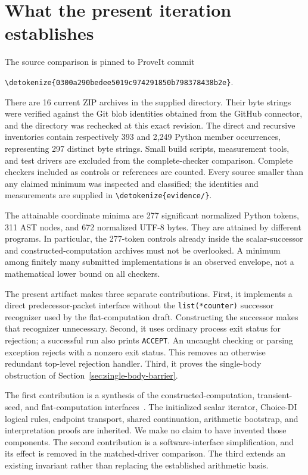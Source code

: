\documentclass[11pt,letterpaper]{article}
\theoremstyle{definition}\newtheorem{definition}[theorem]{Definition}
\theoremstyle{remark}\newtheorem{remark}[theorem]{Remark}
\newcommand{\file}[1]{\expandafter\nolinkurl\expandafter{\detokenize{#1}}}
\begin{document}
\section{What the present iteration establishes}

The source comparison is pinned to ProveIt commit
\begin{center}\small
\file{0300a290bedee5019c974291850b798378438b2e}.
\end{center}
There are 16 current ZIP archives in the supplied directory. Their byte
strings were verified against the Git blob identities obtained from the
GitHub connector, and the directory was rechecked at this exact revision.
The direct and recursive inventories contain respectively 393 and 2,249
Python member occurrences, representing 297 distinct byte strings.
Small build scripts, measurement tools, and test drivers are excluded from
the complete-checker comparison. Complete checkers included as controls
or references are counted. Every source smaller than any claimed minimum
was inspected and classified; the identities and measurements are supplied
in \file{evidence/}.

The attainable coordinate minima are 277 significant normalized Python
tokens, 311 AST nodes, and 672 normalized UTF-8 bytes. They are attained
by different programs. In particular, the 277-token controls already
inside the scalar-successor and constructed-computation archives must not
be overlooked. A minimum among finitely many submitted implementations
is an observed envelope, not a mathematical lower bound on all checkers.

The present artifact makes three separate contributions.
First, it implements a direct predecessor-packet interface without the
\texttt{list(*counter)} successor recognizer used by the flat-computation
draft. Constructing the successor makes that recognizer unnecessary.
Second, it uses ordinary process exit status for rejection; a successful
run also prints \texttt{ACCEPT}. An uncaught checking or parsing exception
rejects with a nonzero exit status. This removes an otherwise redundant
top-level rejection handler. Third, it proves the single-body obstruction
of Section~\ref{sec:single-body-barrier}.

The first contribution is a synthesis of the constructed-computation,
transient-seed, and flat-computation interfaces~\cite{constructed,transient,flat}.
The initialized scalar iterator, Choice-DI logical rules, endpoint
transport, shared continuation, arithmetic bootstrap, and interpretation
proofs are inherited. We make no claim to have invented those components.
The second contribution is a software-interface simplification, and its
effect is removed in the matched-driver comparison. The third extends an
existing invariant rather than replacing the established arithmetic basis.
\end{document}
